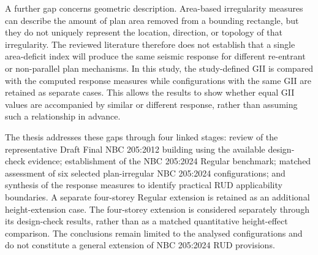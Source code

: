A further gap concerns geometric description. Area-based irregularity measures can describe the amount of plan area removed from a bounding rectangle, but they do not uniquely represent the location, direction, or topology of that irregularity. The reviewed literature therefore does not establish that a single area-deficit index will produce the same seismic response for different re-entrant or non-parallel plan mechanisms. In this study, the study-defined GII is compared with the computed response measures while configurations with the same GII are retained as separate cases. This allows the results to show whether equal GII values are accompanied by similar or different response, rather than assuming such a relationship in advance.

The thesis addresses these gaps through four linked stages: review of the representative Draft Final NBC 205:2012 building using the available design-check evidence; establishment of the NBC 205:2024 Regular benchmark; matched assessment of six selected plan-irregular NBC 205:2024 configurations; and synthesis of the response measures to identify practical RUD applicability boundaries. A separate four-storey Regular extension is retained as an additional height-extension case. The four-storey extension is considered separately through its design-check results, rather than as a matched quantitative height-effect comparison. The conclusions remain limited to the analysed configurations and do not constitute a general extension of NBC 205:2024 RUD provisions.
